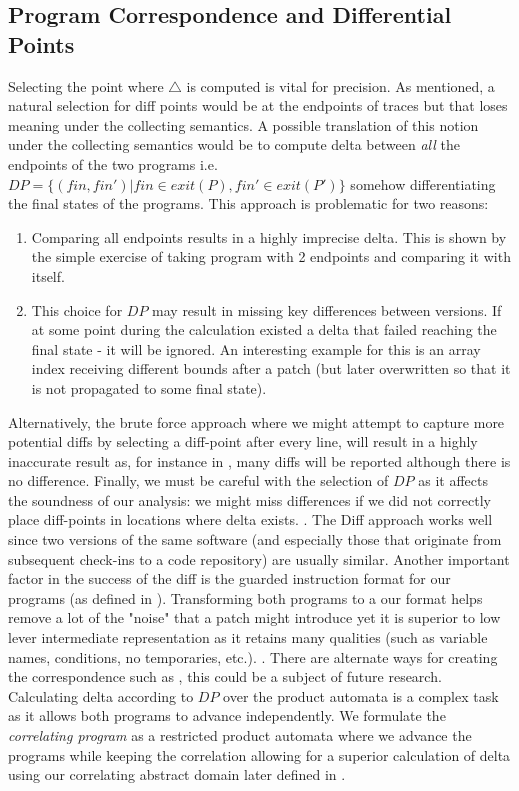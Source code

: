 \subsection{Program Correspondence and Differential Points} 
Selecting the point where $\triangle$ is computed is vital for precision. As mentioned, a natural selection for diff points would be at the endpoints of traces but that loses meaning under the collecting semantics. A possible translation of this notion under the collecting semantics would be to compute delta between \emph{all} the endpoints of the two programs i.e. $DP = \{(fin,fin') | fin \in exit(P), fin' \in exit(P') \}$ somehow differentiating the final states of the programs. This approach is problematic for two reasons:
\begin{enumerate}
\item Comparing all endpoints results in a highly imprecise delta. This is shown by the simple exercise of taking program with 2 endpoints and comparing it with itself.
\item This choice for $DP$ may result in missing key differences between versions. If at some point during the calculation existed a delta that failed reaching the final state - it will be ignored. An interesting example for this is an array index receiving different bounds after a patch (but later overwritten so that it is not propagated to some final state).
\end{enumerate}
Alternatively, the brute force approach where we might attempt to capture more potential diffs by selecting a diff-point after every line, will result in a highly inaccurate result as, for instance in , many diffs will be reported although there is no difference.
Finally, we must be careful with the selection of $DP$ as it affects the soundness of our analysis: we might miss differences if we did not correctly place diff-points in locations where delta exists.
 . The Diff approach works well since two versions of the same software (and especially those that originate from subsequent check-ins to a code repository) are usually similar. Another important factor in the success of the diff is the guarded instruction format for our programs (as defined in ). Transforming both programs to a our format helps remove a lot of the "noise" that a patch might introduce yet it is superior to low lever intermediate representation as it retains many qualities (such as variable names, conditions, no temporaries, etc.). . There are alternate ways for creating the correspondence such as , this could be a subject of future research. Calculating delta according to $DP$ over the product automata is a complex task as it allows both programs to advance independently. We formulate the \emph{correlating program} as a restricted product automata where we advance the programs while keeping the correlation allowing for a superior calculation of delta using our correlating abstract domain later defined in .

